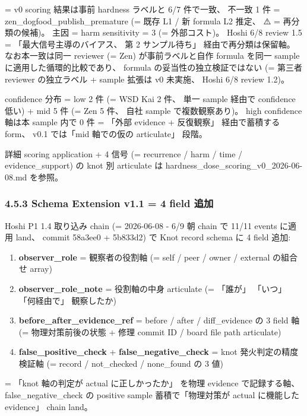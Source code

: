 \documentclass[
]{article}
\newcounter{none} %
\providecommand{\tightlist}{%
  \setlength{\itemsep}{0pt}\setlength{\parskip}{0pt}}
\begin{document}
= v0 scoring 結果は事前 hardness ラベルと 6/7 件で一致、 不一致 1 件 =
zen\_dogfood\_publish\_premature (= 既存 L1 / 新 formula L2 推定、 ⚠️ =
再分類の候補)。 主因 = harm sensitivity = 3 (= 外部コスト)。 Hoshi 6/8
review 1.5 = 「最大信号主導のバイアス、 第 2 サンプル待ち」
経由で再分類は保留軸。 なお本一致は同一 reviewer (= Zen)
が事前ラベルと自作 formula を同一 sample に適用した循環的比較であり、
formula の妥当性の独立検証ではない (= 第三者 reviewer の独立ラベル +
sample 拡張は v0 未実施、 Hoshi 6/8 review 1.2)。

confidence 分布 = low 2 件 (= WSD Kai 2 件、 単一 sample 経由で
confidence 低い) + mid 5 件 (= Zen 5 件、 自社 sample で複数観察あり)。
high confidence 軸は本 sample 内で 0 件 = 「外部 evidence + 反復観察」
経由で蓄積する form、 v0.1 では「mid 軸での仮の articulate」 段階。

詳細 scoring application + 4 信号 (= recurrence / harm / time /
evidence\_support) の knot 別 articulate は
hardness\_dose\_scoring\_v0\_2026-06-08.md を参照。

\subsubsection{4.5.3 Schema Extension v1.1 = 4 field
追加}\label{schema-extension-v1.1-4-field-ux8ffdux52a0}

Hoshi P1 1.4 取り込み chain (= 2026-06-08 - 6/9 朝 chain で 11/11 events
に適用 land、 commit 58a3ee0 + 5b833d2) で Knot record schema に 4 field
追加:

\begin{enumerate}
\def\labelenumi{\arabic{enumi}.}
\tightlist
\item
  \textbf{observer\_role} = 観察者の役割軸 (= self / peer / owner /
  external の組合せ array)
\item
  \textbf{observer\_role\_note} = 役割軸の中身 articulate (= 「誰が」
  「いつ」 「何経由で」 観察したか)
\item
  \textbf{before\_after\_evidence\_ref} = before / after /
  diff\_evidence の 3 field 軸 (= 物理対策前後の状態 + 修理 commit ID /
  board file path articulate)
\item
  \textbf{false\_positive\_check} + \textbf{false\_negative\_check} =
  knot 発火判定の精度検証軸 (= record / not\_checked / none\_found の 3
  値)
\end{enumerate}

= 「knot 軸の判定が actual に正しかったか」 を物理 evidence
で記録する軸、 false\_negative\_check の positive sample
蓄積で「物理対策が actual に機能した evidence」 chain land。
\end{document}

